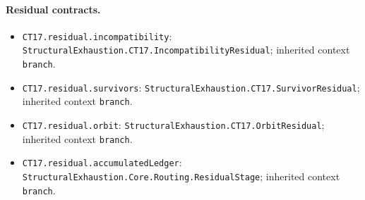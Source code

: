 \begingroup\small\sloppy
\paragraph{Residual contracts.}
\begin{itemize}
\item \texttt{CT17.\allowbreak{}residual.\allowbreak{}incompat\allowbreak{}ibility}: \texttt{Structural\allowbreak{}Exhaustion.\allowbreak{}CT17.\allowbreak{}Incompati\allowbreak{}bility\allowbreak{}Residual}; inherited context \texttt{branch}.
\item \texttt{CT17.\allowbreak{}residual.\allowbreak{}survivors}: \texttt{Structural\allowbreak{}Exhaustion.\allowbreak{}CT17.\allowbreak{}Survivor\allowbreak{}Residual}; inherited context \texttt{branch}.
\item \texttt{CT17.\allowbreak{}residual.\allowbreak{}orbit}: \texttt{Structural\allowbreak{}Exhaustion.\allowbreak{}CT17.\allowbreak{}Orbit\allowbreak{}Residual}; inherited context \texttt{branch}.
\item \texttt{CT17.\allowbreak{}residual.\allowbreak{}accumulated\allowbreak{}Ledger}: \texttt{Structural\allowbreak{}Exhaustion.\allowbreak{}Core.\allowbreak{}Routing.\allowbreak{}Residual\allowbreak{}Stage}; inherited context \texttt{branch}.
\end{itemize}
\endgroup
